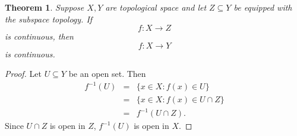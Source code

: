 \documentclass[12pt]{article}
\newtheorem{thm}{Theorem}
\begin{document}
\begin{thm}
Suppose $X,Y$ are topological space and 
let $Z\subseteq  Y$ be equipped with the subspace topology. 
If 
   $$
       f\colon X\to Z
   $$
is continuous, then 
   $$
       f\colon X\to Y
   $$
is continuous.
\end{thm}

\begin{proof} 
Let $U\subseteq Y$ be an open set. Then  
\begin{eqnarray*}
  f^{-1}(U) &=& \{ x\in X : f(x) \in U\} \\
            &=& \{ x\in X : f(x) \in U\cap Z\} \\
            &=& f^{-1}(U\cap Z).
\end{eqnarray*}
Since $U\cap Z$ is open in $Z$, $f^{-1}(U)$ is open in $X$. 
\end{proof}
\end{document}
